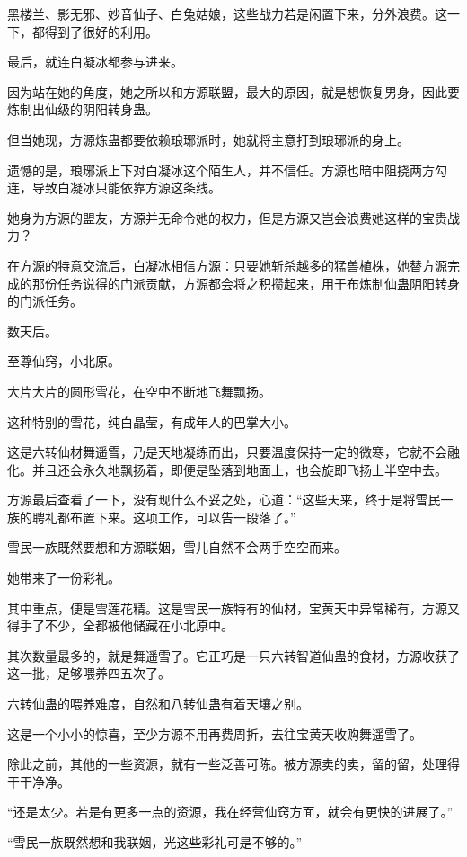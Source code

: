 \begin{this_body}
黑楼兰、影无邪、妙音仙子、白兔姑娘，这些战力若是闲置下来，分外浪费。这一下，都得到了很好的利用。

最后，就连白凝冰都参与进来。

因为站在她的角度，她之所以和方源联盟，最大的原因，就是想恢复男身，因此要炼制出仙级的阴阳转身蛊。

但当她现，方源炼蛊都要依赖琅琊派时，她就将主意打到琅琊派的身上。

遗憾的是，琅琊派上下对白凝冰这个陌生人，并不信任。方源也暗中阻挠两方勾连，导致白凝冰只能依靠方源这条线。

她身为方源的盟友，方源并无命令她的权力，但是方源又岂会浪费她这样的宝贵战力？

在方源的特意交流后，白凝冰相信方源：只要她斩杀越多的猛兽植株，她替方源完成的那份任务说得的门派贡献，方源都会将之积攒起来，用于布炼制仙蛊阴阳转身的门派任务。

数天后。

至尊仙窍，小北原。

大片大片的圆形雪花，在空中不断地飞舞飘扬。

这种特别的雪花，纯白晶莹，有成年人的巴掌大小。

这是六转仙材舞遥雪，乃是天地凝练而出，只要温度保持一定的微寒，它就不会融化。并且还会永久地飘扬着，即便是坠落到地面上，也会旋即飞扬上半空中去。

方源最后查看了一下，没有现什么不妥之处，心道：“这些天来，终于是将雪民一族的聘礼都布置下来。这项工作，可以告一段落了。”

雪民一族既然要想和方源联姻，雪儿自然不会两手空空而来。

她带来了一份彩礼。

其中重点，便是雪莲花精。这是雪民一族特有的仙材，宝黄天中异常稀有，方源又得手了不少，全都被他储藏在小北原中。

其次数量最多的，就是舞遥雪了。它正巧是一只六转智道仙蛊的食材，方源收获了这一批，足够喂养四五次了。

六转仙蛊的喂养难度，自然和八转仙蛊有着天壤之别。

这是一个小小的惊喜，至少方源不用再费周折，去往宝黄天收购舞遥雪了。

除此之前，其他的一些资源，就有一些泛善可陈。被方源卖的卖，留的留，处理得干干净净。

“还是太少。若是有更多一点的资源，我在经营仙窍方面，就会有更快的进展了。”

“雪民一族既然想和我联姻，光这些彩礼可是不够的。”


\end{this_body}
